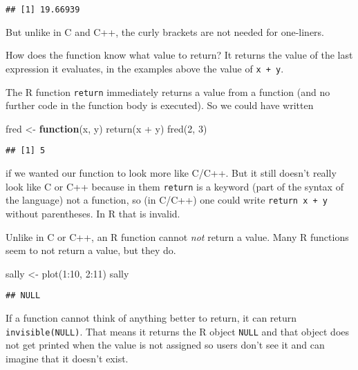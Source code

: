 \documentclass[
]{article}
\newenvironment{Shaded}{\begin{snugshade}}{\end{snugshade}}
\newcommand{\ControlFlowTok}[1]{\textcolor[rgb]{0.13,0.29,0.53}{\textbf{#1}}}
\newcommand{\DecValTok}[1]{\textcolor[rgb]{0.00,0.00,0.81}{#1}}
\newcommand{\FunctionTok}[1]{\textcolor[rgb]{0.00,0.00,0.00}{#1}}
\newcommand{\NormalTok}[1]{#1}
\newcommand{\OtherTok}[1]{\textcolor[rgb]{0.56,0.35,0.01}{#1}}
\newcommand{\SpecialCharTok}[1]{\textcolor[rgb]{0.00,0.00,0.00}{#1}}
\begin{document}
\begin{verbatim}
## [1] 19.66939
\end{verbatim}

But unlike in C and C++, the curly brackets are not needed for
one-liners.

How does the function know what value to return? It returns the value of
the last expression it evaluates, in the examples above the value of
\texttt{x\ +\ y}.

The R function \texttt{return} immediately returns a value from a
function (and no further code in the function body is executed). So we
could have written

\begin{Shaded}
\begin{Highlighting}[]
\NormalTok{fred }\OtherTok{\textless{}{-}} \ControlFlowTok{function}\NormalTok{(x, y) }\FunctionTok{return}\NormalTok{(x }\SpecialCharTok{+}\NormalTok{ y)}
\FunctionTok{fred}\NormalTok{(}\DecValTok{2}\NormalTok{, }\DecValTok{3}\NormalTok{)}
\end{Highlighting}
\end{Shaded}

\begin{verbatim}
## [1] 5
\end{verbatim}

if we wanted our function to look more like C/C++. But it still doesn't
really look like C or C++ because in them \texttt{return} is a keyword
(part of the syntax of the language) not a function, so (in C/C++) one
could write \texttt{return\ x\ +\ y} without parentheses. In R that is
invalid.

Unlike in C or C++, an R function cannot \emph{not} return a value. Many
R functions seem to not return a value, but they do.

\begin{Shaded}
\begin{Highlighting}[]
\NormalTok{sally }\OtherTok{\textless{}{-}} \FunctionTok{plot}\NormalTok{(}\DecValTok{1}\SpecialCharTok{:}\DecValTok{10}\NormalTok{, }\DecValTok{2}\SpecialCharTok{:}\DecValTok{11}\NormalTok{)}
\NormalTok{sally}
\end{Highlighting}
\end{Shaded}

\begin{verbatim}
## NULL
\end{verbatim}

If a function cannot think of anything better to return, it can return
\texttt{invisible(NULL)}. That means it returns the R object
\texttt{NULL} and that object does not get printed when the value is not
assigned so users don't see it and can imagine that it doesn't exist.
\end{document}

